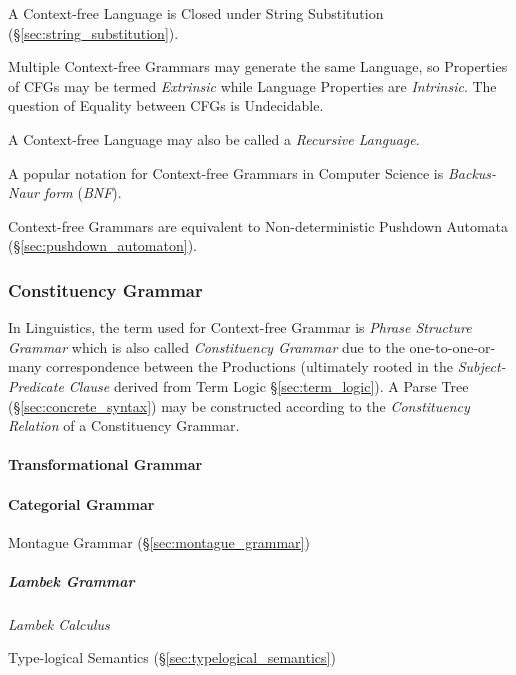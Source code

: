 A Context-free Language is Closed under String Substitution
(\S\ref{sec:string_substitution}).

Multiple Context-free Grammars may generate the same Language, so
Properties of CFGs may be termed \emph{Extrinsic} while Language
Properties are \emph{Intrinsic}. The question of Equality between CFGs
is Undecidable.

A Context-free Language may also be called a \emph{Recursive
  Language}.

A popular notation for Context-free Grammars in Computer Science is
\emph{Backus-Naur form} (\emph{BNF}).

Context-free Grammars are equivalent to Non-deterministic Pushdown
Automata (\S\ref{sec:pushdown_automaton}).



\subsubsection{Constituency Grammar}\label{sec:constituency_grammar}

In Linguistics, the term used for Context-free Grammar is \emph{Phrase
  Structure Grammar} which is also called \emph{Constituency Grammar}
due to the one-to-one-or-many correspondence between the Productions
(ultimately rooted in the \emph{Subject-Predicate Clause} derived from
Term Logic \S\ref{sec:term_logic}). A Parse Tree
(\S\ref{sec:concrete_syntax}) may be constructed according to the
\emph{Constituency Relation} of a Constituency Grammar.



\paragraph{Transformational Grammar}\label{sec:transformational_grammar}



\paragraph{Categorial Grammar}\label{sec:categorial_grammar}

Montague Grammar (\S\ref{sec:montague_grammar})

\subparagraph{Lambek Grammar}\label{sec:lambek_grammar}

\emph{Lambek Calculus}

Type-logical Semantics (\S\ref{sec:typelogical_semantics})


